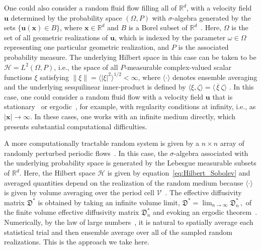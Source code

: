 \documentclass[english,12pt,jmp,graphicx]{revtex4-1}
\newcommand{\vecu}{\boldsymbol{u}}
\newcommand{\vecx}{\boldsymbol{x}}
\newcommand{\Vc}{\mathcal{V}}
\newcommand{\Dg}{\mathfrak{D}}
\newcommand{\Hs}{\mathscr{H}}
\begin{document}
One could also consider a random fluid flow filling all of
$\mathbb{R}^d$, with a velocity field $\vecu$ determined by the
probability space $(\Omega,P)$ with $\sigma$-algebra generated by the sets
$\{\vecu(\vecx)\in B\}$, where $\vecx\in\mathbb{R}^d$ and $B$ is a Borel subset
of $\mathbb{R}^d$~\cite{Avellaneda:CMP-339}. Here, $\Omega$ is the set of
all geometric realizations of $\vecu$, which is indexed by the
parameter $\omega\in\Omega$ representing one particular geometric realization, and
$P$ is the associated probability measure. The underlying Hilbert
space in this case can be taken to be $\Hs=L^2(\Omega,P)$, i.e., the space
of all $P$-measurable complex-valued scalar functions $\xi$ satisfying
$\|\xi\|=\langle|\xi|^2\rangle^{1/2}<\infty$, where
$\langle\cdot\rangle$ denotes ensemble 
averaging and the underlying sesquilinear inner-product is defined by
$\langle\xi,\zeta\rangle=\langle\,\overline{\xi} \ \zeta\rangle$ . In this case, one could
consider a random fluid flow with a velocity field $\vecu$ that is
stationary~\cite{McLaughlin:SIAM_JAM:780} or
ergodic~\cite{Avellaneda:PRL-753,Avellaneda:CMP-339}, for example,
with regularity conditions at infinity, i.e., as $|\vecx|\to\infty$. In these
cases, one works with an infinite medium directly, which presents
substantial computational difficulties. 



A more computationally tractable random system is given by a $n\times n$
array of randomly perturbed periodic
flows~\cite{Fannjiang:1997:1033}. In this case, the $\sigma$-algebra 
associated with the underlying probability space is generated by the
Lebesgue measurable subsets of $\mathbb{R}^d$. Here, the Hilbert space
$\Hs$ is given by equation~\eqref{eq:Hilbert_Sobolev} and averaged
quantities depend on the realization of the random medium because
$\langle\cdot\rangle$ is given by volume averaging over the period cell
$\Vc$~\cite{Fannjiang:1997:1033}. The 
effective diffusivity matrix $\Dg^*$ is obtained by taking an infinite
volume limit, $\Dg^*=\lim_{n\to\infty}\Dg^*_n\,,$ of the finite volume effective
diffusivity matrix $\Dg^*_n$ and evoking an ergodic
theorem~\cite{Fannjiang:1997:1033,Golden:CMP-473}. Numerically, by the
law of large numbers~\cite{Durrett:Book:Probability}, it is
natural to spatially average each statistical trial and then ensemble
average over all of the sampled random realizations. This is the
approach we take here.
\end{document}
